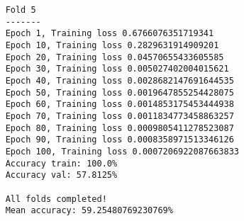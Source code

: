 \begin{verbatim}
    Fold 5
    -------
    Epoch 1, Training loss 0.6766076351719341
    Epoch 10, Training loss 0.2829631914909201
    Epoch 20, Training loss 0.04570655433605585
    Epoch 30, Training loss 0.005027402004015621
    Epoch 40, Training loss 0.0028682147691644535
    Epoch 50, Training loss 0.0019647855254428075
    Epoch 60, Training loss 0.0014853175453444938
    Epoch 70, Training loss 0.0011834773458863257
    Epoch 80, Training loss 0.0009805411278523087
    Epoch 90, Training loss 0.0008358971513346126
    Epoch 100, Training loss 0.0007206922087663833
    Accuracy train: 100.0%
    Accuracy val: 57.8125%
    
    All folds completed!
    Mean accuracy: 59.25480769230769%
    \end{verbatim}